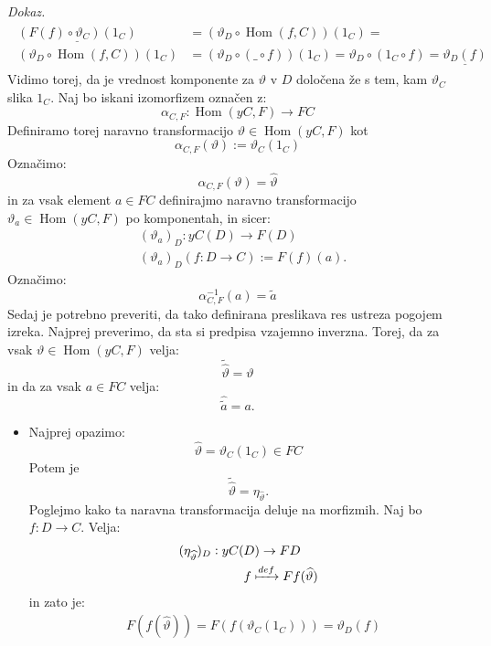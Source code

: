 \documentclass[12pt,a4paper]{book}
\theoremstyle{definition}
\theoremstyle{plain}
\newenvironment{dokaz}{\emph{Dokaz.}\ }{\hspace{\fill}{$\Box$}}
\theoremstyle{definition}
\theoremstyle{remark}
\DeclareMathOperator{\Hom}{Hom}
\begin{document}
\begin{dokaz}
\begin{align} \label{eq1}
\begin{split}
\underline{(F(f) \circ \vartheta_C)(1_C)}& = (\vartheta_D \circ \Hom(f,C))(1_C) = \\
(\vartheta_D \circ \Hom(f,C))(1_C)& = (\vartheta_D \circ ( \_ \circ f ))(1_C) =
\vartheta_D \circ ( 1_C \circ f) = \underline{\vartheta_D(f)}
\end{split}
\end{align}
Vidimo torej, da je vrednost komponente za $\vartheta$ v $D$ določena že s tem, kam $\vartheta_C$ slika $1_C$.
Naj bo iskani izomorfizem označen z: 
$$\alpha_{C,F} : \Hom(yC,F) \to FC$$ 
Definiramo torej naravno transformacijo $\vartheta \in \Hom(yC,F)$ kot
\begin{equation}
\alpha_{C,F}(\vartheta) := \vartheta_C(1_C)
\end{equation}
%
Označimo:
\begin{equation}
\boxed{\alpha_{C,F}(\vartheta) = \widehat{\vartheta}}
\end{equation} 
%
in za vsak element $a \in FC$ definirajmo naravno transformacijo $\vartheta_a \in \Hom(yC,F)$ po komponentah, in sicer:
\begin{align}
&(\vartheta_a)_D : yC(D) \to F(D) \\
&(\vartheta_a)_D(f : D \to C) := F(f)(a).
\end{align}
%
Označimo:
\begin{equation}
\boxed{\alpha^{-1}_{C,F}(a) = \widetilde{a}}
\end{equation}
%
Sedaj je potrebno preveriti, da tako definirana preslikava res ustreza pogojem izreka.
Najprej preverimo, da sta si predpisa vzajemno inverzna.
Torej, da za vsak $\vartheta \in \Hom(yC,F)$ velja: 
$$\widetilde{\widehat{\vartheta}} = \vartheta$$
in da za vsak $a \in FC$ velja:
$$\widehat{\widetilde{a}} = a.$$
\begin{itemize}
\item Najprej opazimo:
$$\widehat{\vartheta} = \vartheta_C(1_C) \in FC$$
Potem je 
$$\widetilde{\widehat{\vartheta}} = \eta_{\widehat{\vartheta}}.$$
Poglejmo kako ta naravna transformacija deluje na morfizmih. Naj bo $f : D \to C$. Velja:
\begin{align*}
(\eta_{\widehat{\vartheta}})_D : yC(&D) \to FD \\
&f \xmapsto{def} Ff(\widehat{\vartheta}) \\
\end{align*}
%
in zato je:
\begin{align*}
&F(f(\widehat{\vartheta})) = F(f(\vartheta_C(1_C))) = \vartheta_D(f) \\

\end{align*}
\end{itemize}
\end{dokaz}
\end{document}
